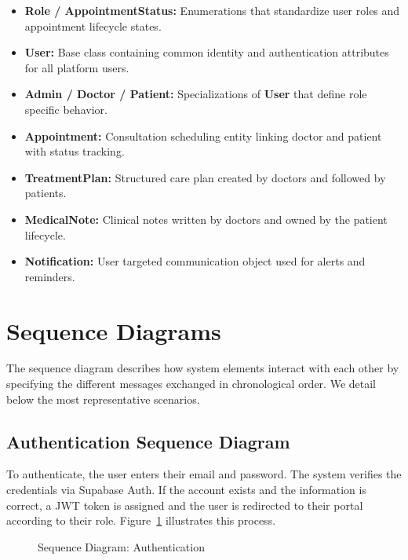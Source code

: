 \documentclass[12pt,a4paper,oneside]{report}
\begin{document}
\begin{itemize}
    \item \textbf{Role / AppointmentStatus:} Enumerations that standardize user roles and appointment lifecycle states.
    \item \textbf{User:} Base class containing common identity and authentication attributes for all platform users.
    \item \textbf{Admin / Doctor / Patient:} Specializations of \textbf{User} that define role specific behavior.
    \item \textbf{Appointment:} Consultation scheduling entity linking doctor and patient with status tracking.
    \item \textbf{TreatmentPlan:} Structured care plan created by doctors and followed by patients.
    \item \textbf{MedicalNote:} Clinical notes written by doctors and owned by the patient lifecycle.
    \item \textbf{Notification:} User targeted communication object used for alerts and reminders.
\end{itemize}


\section{Sequence Diagrams}

The sequence diagram describes how system elements interact with each other by specifying the different messages exchanged in chronological order. We detail below the most representative scenarios.

\subsection{Authentication Sequence Diagram}

To authenticate, the user enters their email and password. The system verifies the credentials via Supabase Auth. If the account exists and the information is correct, a JWT token is assigned and the user is redirected to their portal according to their role. Figure~\ref{fig:seq auth} illustrates this process.

\begin{figure}[H]
    \centering
    \resizebox{0.92\textwidth}{!}{}
    \caption{Sequence Diagram: Authentication}
    \label{fig:seq auth}
\end{figure}
\end{document}

